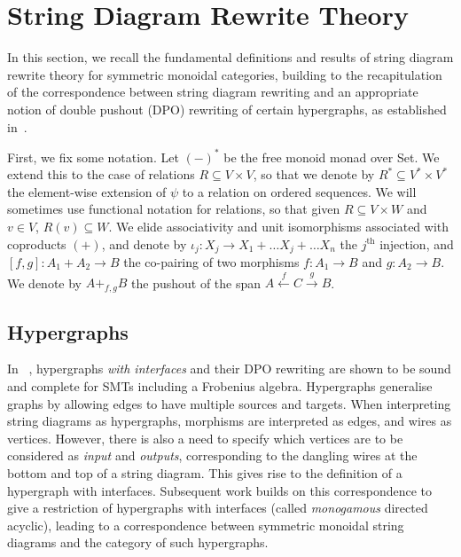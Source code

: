 \section{String Diagram Rewrite Theory}\label{sec:combinatorial-semantics}

In this section,  we recall the fundamental definitions and results of string diagram rewrite theory for symmetric monoidal categories,  building to the recapitulation of the correspondence between string diagram rewriting and an appropriate notion of double pushout (DPO) rewriting of certain hypergraphs,  as established in~\cite{bonchi_string_2022-1, bonchi_string_2022-2}.  

First,  we fix some notation.  Let $(-)^*$ be the free monoid monad over \textsf{Set}.  
We extend this to the case of relations $R \subseteq V \times V$,  so that we denote by $R^{*} \subseteq V^* \times V^*$ the element-wise extension of $\psi$ to a relation on ordered sequences. 
We will sometimes use functional notation for relations,  so that given $R \subseteq V \times W$ and $v \in V$,  $R(v) \subseteq W$. 
We elide associativity and unit isomorphisms associated with coproducts $(+)$,  and denote by $\iota_j: X_{j} \rightarrow X_{1} + \ldots X_{j} + \ldots X_{n}$ the $j^{\text{th}}$ injection,  and $[f,g]: A_1 + A_2 \to B$ the co-pairing of two morphisms $f: A_1 \to B$ and $g:A_2 \to B$. 
We denote by $A +_{f,g} B$ the pushout of the span $A \xleftarrow{f} C \xrightarrow{g} B$.

\subsection{Hypergraphs}

In ~\cite{bonchi_string_2022-1},  hypergraphs \textit{with interfaces} and their DPO rewriting are shown to be sound and complete for SMTs including a Frobenius algebra. 
Hypergraphs generalise graphs by allowing edges to have multiple sources and targets. 
When interpreting string diagrams as hypergraphs,  morphisms are interpreted as edges,  and wires as vertices.  
However,  there is also a need to specify which vertices are to be considered as \textit{input} and \textit{outputs},  corresponding to the dangling wires at the bottom and top of a string diagram. 
This gives rise to the definition of a hypergraph with interfaces.  
Subsequent work \cite{bonchi_string_2022-2} builds on this correspondence to give a restriction of hypergraphs with interfaces (called \textit{monogamous} directed acyclic),  leading to a correspondence between symmetric monoidal string diagrams and the category of such hypergraphs.


